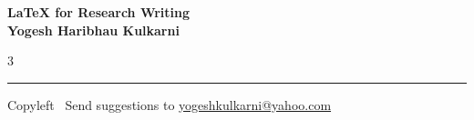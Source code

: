 \documentclass[8pt,landscape]{article}
\begin{document}
\footnotesize


\begin{center}
\Large{\textbf{\LaTeX{} for Research Writing\\ Yogesh Haribhau Kulkarni}}
\end{center}

\begin{multicols}{3}

\end{multicols}

\rule{\linewidth}{0.25pt}
\scriptsize
Copyleft \textcopyleft\  Send suggestions to
\href{http://www.yogeshkulkarni.com}{yogeshkulkarni@yahoo.com}
\end{document}
